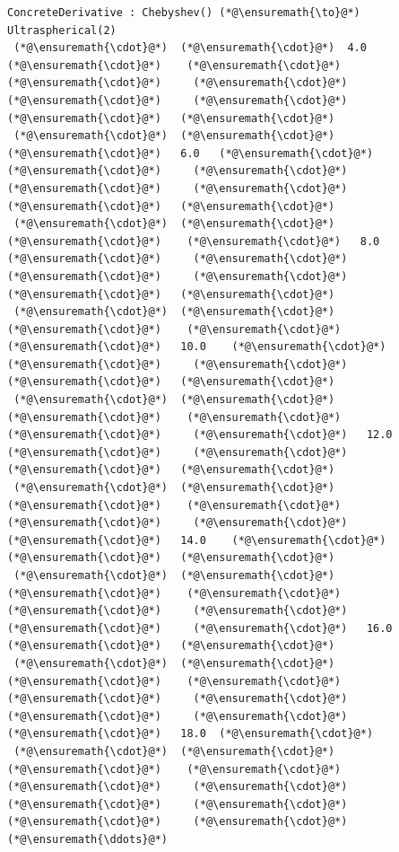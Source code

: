\documentclass[12pt,a4paper]{article}
\begin{document}
\begin{lstlisting}
ConcreteDerivative : Chebyshev() (*@\ensuremath{\to}@*) Ultraspherical(2)
 (*@\ensuremath{\cdot}@*)  (*@\ensuremath{\cdot}@*)  4.0   (*@\ensuremath{\cdot}@*)    (*@\ensuremath{\cdot}@*)     (*@\ensuremath{\cdot}@*)     (*@\ensuremath{\cdot}@*)     (*@\ensuremath{\cdot}@*)     (*@\ensuremath{\cdot}@*)     (*@\ensuremath{\cdot}@*)   (*@\ensuremath{\cdot}@*)
 (*@\ensuremath{\cdot}@*)  (*@\ensuremath{\cdot}@*)   (*@\ensuremath{\cdot}@*)   6.0   (*@\ensuremath{\cdot}@*)     (*@\ensuremath{\cdot}@*)     (*@\ensuremath{\cdot}@*)     (*@\ensuremath{\cdot}@*)     (*@\ensuremath{\cdot}@*)     (*@\ensuremath{\cdot}@*)   (*@\ensuremath{\cdot}@*)
 (*@\ensuremath{\cdot}@*)  (*@\ensuremath{\cdot}@*)   (*@\ensuremath{\cdot}@*)    (*@\ensuremath{\cdot}@*)   8.0    (*@\ensuremath{\cdot}@*)     (*@\ensuremath{\cdot}@*)     (*@\ensuremath{\cdot}@*)     (*@\ensuremath{\cdot}@*)     (*@\ensuremath{\cdot}@*)   (*@\ensuremath{\cdot}@*)
 (*@\ensuremath{\cdot}@*)  (*@\ensuremath{\cdot}@*)   (*@\ensuremath{\cdot}@*)    (*@\ensuremath{\cdot}@*)    (*@\ensuremath{\cdot}@*)   10.0    (*@\ensuremath{\cdot}@*)     (*@\ensuremath{\cdot}@*)     (*@\ensuremath{\cdot}@*)     (*@\ensuremath{\cdot}@*)   (*@\ensuremath{\cdot}@*)
 (*@\ensuremath{\cdot}@*)  (*@\ensuremath{\cdot}@*)   (*@\ensuremath{\cdot}@*)    (*@\ensuremath{\cdot}@*)    (*@\ensuremath{\cdot}@*)     (*@\ensuremath{\cdot}@*)   12.0    (*@\ensuremath{\cdot}@*)     (*@\ensuremath{\cdot}@*)     (*@\ensuremath{\cdot}@*)   (*@\ensuremath{\cdot}@*)
 (*@\ensuremath{\cdot}@*)  (*@\ensuremath{\cdot}@*)   (*@\ensuremath{\cdot}@*)    (*@\ensuremath{\cdot}@*)    (*@\ensuremath{\cdot}@*)     (*@\ensuremath{\cdot}@*)     (*@\ensuremath{\cdot}@*)   14.0    (*@\ensuremath{\cdot}@*)     (*@\ensuremath{\cdot}@*)   (*@\ensuremath{\cdot}@*)
 (*@\ensuremath{\cdot}@*)  (*@\ensuremath{\cdot}@*)   (*@\ensuremath{\cdot}@*)    (*@\ensuremath{\cdot}@*)    (*@\ensuremath{\cdot}@*)     (*@\ensuremath{\cdot}@*)     (*@\ensuremath{\cdot}@*)     (*@\ensuremath{\cdot}@*)   16.0    (*@\ensuremath{\cdot}@*)   (*@\ensuremath{\cdot}@*)
 (*@\ensuremath{\cdot}@*)  (*@\ensuremath{\cdot}@*)   (*@\ensuremath{\cdot}@*)    (*@\ensuremath{\cdot}@*)    (*@\ensuremath{\cdot}@*)     (*@\ensuremath{\cdot}@*)     (*@\ensuremath{\cdot}@*)     (*@\ensuremath{\cdot}@*)     (*@\ensuremath{\cdot}@*)   18.0  (*@\ensuremath{\cdot}@*)
 (*@\ensuremath{\cdot}@*)  (*@\ensuremath{\cdot}@*)   (*@\ensuremath{\cdot}@*)    (*@\ensuremath{\cdot}@*)    (*@\ensuremath{\cdot}@*)     (*@\ensuremath{\cdot}@*)     (*@\ensuremath{\cdot}@*)     (*@\ensuremath{\cdot}@*)     (*@\ensuremath{\cdot}@*)     (*@\ensuremath{\cdot}@*)   (*@\ensuremath{\ddots}@*)

\end{lstlisting}
\end{document}
